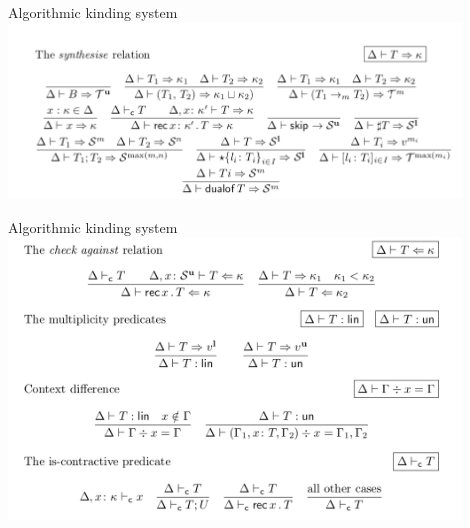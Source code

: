 \documentclass[10pt]{beamer}
\begin{document}
{
\begin{frame}{Algorithmic kinding system}
	\hspace*{-8mm}\includegraphics[width=12cm]{img/synthesise}
\end{frame}

\begin{frame}{Algorithmic kinding system}
	\hspace*{-8mm}\includegraphics[width=12cm]{img/kinding}	
\end{frame}


}
\end{document}

